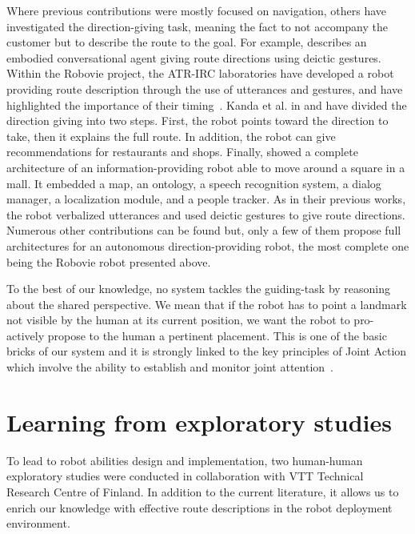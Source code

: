 Where previous contributions were mostly focused on navigation, others have investigated the direction-giving task, meaning the fact to not accompany the customer but to describe the route to the goal. For example, \cite{cassell_2007_trading} describes an embodied conversational agent giving route directions using deictic gestures. Within the Robovie project, the ATR-IRC laboratories have developed a robot providing route description through the use of utterances and gestures, and have highlighted the importance of their timing~\cite{okuno_2009_providing}. Kanda et al. in \cite{kanda_2009_affective} and \cite{kanda_2010_communication} have divided the direction giving into two steps. First, the robot points toward the direction to take, then it explains the full route. In addition, the robot can give recommendations for restaurants and shops. Finally, \cite{satake_2015_should} showed a complete architecture of an information-providing robot able to move around a square in a mall. It embedded a map, an ontology, a speech recognition system, a dialog manager, a localization module, and a people tracker. As in their previous works, the robot verbalized utterances and used deictic gestures to give route directions. Numerous other contributions can be found but, only a few of them propose full architectures for an autonomous direction-providing robot, the most complete one being the Robovie robot presented above. 

To the best of our knowledge, no system tackles the guiding-task by reasoning about the shared perspective. We mean that if the robot has to point a landmark not visible by the human at its current position, we want the robot to pro-actively propose to the human a pertinent placement. This is one of the basic bricks of our system and it is strongly linked to the key principles of Joint Action which involve the ability to establish and monitor joint attention~\cite{pacherie_2012_phenomenology}.

\section{Learning from exploratory studies}

To lead to robot abilities design and implementation, two human-human exploratory studies were conducted in collaboration with VTT Technical Research Centre of Finland. In addition to the current literature, it allows us to enrich our knowledge with effective route descriptions in the robot deployment environment.

